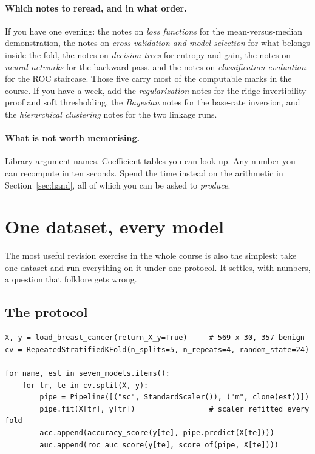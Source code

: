 \documentclass[11pt]{article}
\begin{document}
\paragraph{Which notes to reread, and in what order.} If you have one evening:
the notes on \emph{loss functions} for the mean-versus-median demonstration,
the notes on \emph{cross-validation and model selection} for what belongs
inside the fold, the notes on \emph{decision trees} for entropy and gain, the
notes on \emph{neural networks} for the backward pass, and the notes on
\emph{classification evaluation} for the ROC staircase. Those five carry most
of the computable marks in the course. If you have a week, add the
\emph{regularization} notes for the ridge invertibility proof and soft
thresholding, the \emph{Bayesian} notes for the base-rate inversion, and the
\emph{hierarchical clustering} notes for the two linkage runs.

\paragraph{What is not worth memorising.} Library argument names. Coefficient
tables you can look up. Any number you can recompute in ten seconds. Spend
the time instead on the arithmetic in Section~\ref{sec:hand}, all of which you
can be asked to \emph{produce}.

\section{One dataset, every model}
\label{sec:zoo}

The most useful revision exercise in the whole course is also the simplest:
take one dataset and run everything on it under one protocol. It settles, with
numbers, a question that folklore gets wrong.

\subsection{The protocol}

\begin{lstlisting}
X, y = load_breast_cancer(return_X_y=True)     # 569 x 30, 357 benign
cv = RepeatedStratifiedKFold(n_splits=5, n_repeats=4, random_state=24)

for name, est in seven_models.items():
    for tr, te in cv.split(X, y):
        pipe = Pipeline([("sc", StandardScaler()), ("m", clone(est))])
        pipe.fit(X[tr], y[tr])                 # scaler refitted every fold
        acc.append(accuracy_score(y[te], pipe.predict(X[te])))
        auc.append(roc_auc_score(y[te], score_of(pipe, X[te])))
\end{lstlisting}
\end{document}
